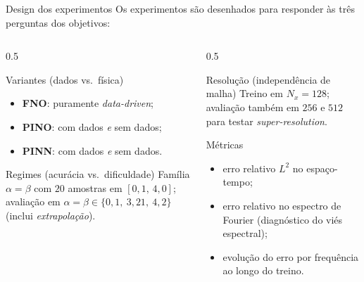 \begin{frame}{Design dos experimentos}
  Os experimentos são desenhados para responder às três perguntas dos objetivos:
  \begin{columns}[T,totalwidth=\textwidth]
    \begin{column}{0.5\textwidth}
      \begin{block}{Variantes (dados vs.\ física)}
        \footnotesize
        \begin{itemize}
          \item \textbf{FNO}: puramente \emph{data-driven};
          \item \textbf{PINO}: com dados \emph{e} sem dados;
          \item \textbf{PINN}: com dados \emph{e} sem dados.
        \end{itemize}
      \end{block}
      \begin{block}{Regimes (acurácia vs.\ dificuldade)}
        \footnotesize
        Família $\alpha=\beta$ com $20$ amostras em $[0{,}1,\,4{,}0]$; avaliação em
        $\alpha=\beta \in \{0{,}1,\ 3{,}21,\ 4{,}2\}$ (inclui \emph{extrapolação}).
      \end{block}
    \end{column}
    \begin{column}{0.5\textwidth}
      \begin{block}{Resolução (independência de malha)}
        \footnotesize
        Treino em $N_x=128$; avaliação também em $256$ e $512$ para testar
        \emph{super-resolution}.
      \end{block}
      \begin{block}{Métricas}
        \footnotesize
        \begin{itemize}
          \item erro relativo $L^2$ no espaço-tempo;
          \item erro relativo no \alert{espectro de Fourier} (diagnóstico do viés espectral);
          \item evolução do erro por frequência ao longo do treino.
        \end{itemize}
      \end{block}
    \end{column}
  \end{columns}
\end{frame}


